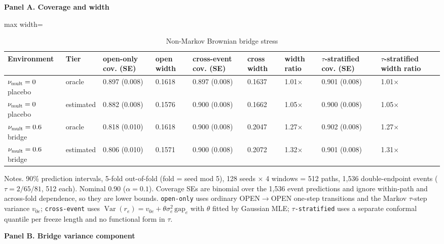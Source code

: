\begin{table}[!htbp]
\centering
\scriptsize
\caption{Non-Markov Brownian bridge stress}
\label{tab:b2}
\vspace{0.5em}
\par\textbf{Panel A. Coverage and width}

\begin{adjustbox}{max width=\linewidth}
\begin{tabular}{@{}lllllllll@{}}
\toprule
Environment & Tier & open-only cov. (SE) & open width & cross-event cov. (SE) & cross width & width ratio & $\tau$-stratified cov. (SE) & $\tau$-stratified width ratio \\
\midrule
$\nu_{\rm mult}=0$ placebo & oracle & 0.897 (0.008) & 0.1618 & 0.897 (0.008) & 0.1637 & 1.01$\times$ & 0.901 (0.008) & 1.01$\times$ \\
$\nu_{\rm mult}=0$ placebo & estimated & 0.882 (0.008) & 0.1576 & 0.900 (0.008) & 0.1662 & 1.05$\times$ & 0.900 (0.008) & 1.05$\times$ \\
$\nu_{\rm mult}=0.6$ bridge & oracle & 0.818 (0.010) & 0.1618 & 0.900 (0.008) & 0.2047 & 1.27$\times$ & 0.902 (0.008) & 1.27$\times$ \\
$\nu_{\rm mult}=0.6$ bridge & estimated & 0.806 (0.010) & 0.1571 & 0.900 (0.008) & 0.2072 & 1.32$\times$ & 0.901 (0.008) & 1.31$\times$ \\
\bottomrule
\end{tabular}
\end{adjustbox}
\vspace{0.5em}
\par\noindent\begin{minipage}{\linewidth}\raggedright{\scriptsize Notes. 90\% prediction intervals, 5-fold out-of-fold (fold = seed mod 5), 128 seeds $\times$ 4 windows = 512 paths, 1,536 double-endpoint events ($\tau=2/65/81$, 512 each). Nominal 0.90 ($\alpha=0.1$). Coverage SEs are binomial over the 1,536 event predictions and ignore within-path and across-fold dependence, so they are lower bounds. \texttt{open-only} uses ordinary OPEN$\to$OPEN one-step transitions and the Markov $\tau$-step variance $v_{0e}$; \texttt{cross-event} uses $\operatorname{Var}(r_e)=v_{0e}+\theta\sigma_e^2\,\mathrm{gap}_e$ with $\theta$ fitted by Gaussian MLE; \texttt{$\tau$-stratified} uses a separate conformal quantile per freeze length and no functional form in $\tau$.}\end{minipage}\par

\par\textbf{Panel B. Bridge variance component}


\end{table}
